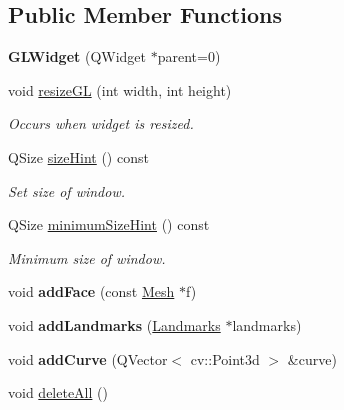 \subsection*{Public Member Functions}
\begin{DoxyCompactItemize}
\item 
\hypertarget{class_g_l_widget_ab79c391c86de1ffb76f6950b49d82c0c}{{\bfseries G\+L\+Widget} (Q\+Widget $\ast$parent=0)}\label{class_g_l_widget_ab79c391c86de1ffb76f6950b49d82c0c}

\item 
void \hyperlink{class_g_l_widget_ac0d2a8ecf60907a81c0d73475d851025}{resize\+G\+L} (int width, int height)
\begin{DoxyCompactList}\small\item\em Occurs when widget is resized. \end{DoxyCompactList}\item 
Q\+Size \hyperlink{class_g_l_widget_a57698bc426052845b43a135a13540154}{size\+Hint} () const 
\begin{DoxyCompactList}\small\item\em Set size of window. \end{DoxyCompactList}\item 
Q\+Size \hyperlink{class_g_l_widget_ade3142625c1bfda0576e419b176cf8b1}{minimum\+Size\+Hint} () const 
\begin{DoxyCompactList}\small\item\em Minimum size of window. \end{DoxyCompactList}\item 
\hypertarget{class_g_l_widget_a3947bf1a616e02627b92efb202ffc678}{void {\bfseries add\+Face} (const \hyperlink{class_mesh}{Mesh} $\ast$f)}\label{class_g_l_widget_a3947bf1a616e02627b92efb202ffc678}

\item 
\hypertarget{class_g_l_widget_a80be0cd34782a9d2d34b4c50f8605f6e}{void {\bfseries add\+Landmarks} (\hyperlink{class_landmarks}{Landmarks} $\ast$landmarks)}\label{class_g_l_widget_a80be0cd34782a9d2d34b4c50f8605f6e}

\item 
\hypertarget{class_g_l_widget_a517e3a0f84e2bacd25e0f861c8ecc5d4}{void {\bfseries add\+Curve} (Q\+Vector$<$ cv\+::\+Point3d $>$ \&curve)}\label{class_g_l_widget_a517e3a0f84e2bacd25e0f861c8ecc5d4}

\item 
\hypertarget{class_g_l_widget_ac1f9329242410b4e5fd256a6d84f9aa7}{void \hyperlink{class_g_l_widget_ac1f9329242410b4e5fd256a6d84f9aa7}{delete\+All} ()}\label{class_g_l_widget_ac1f9329242410b4e5fd256a6d84f9aa7}


\end{DoxyCompactItemize}
